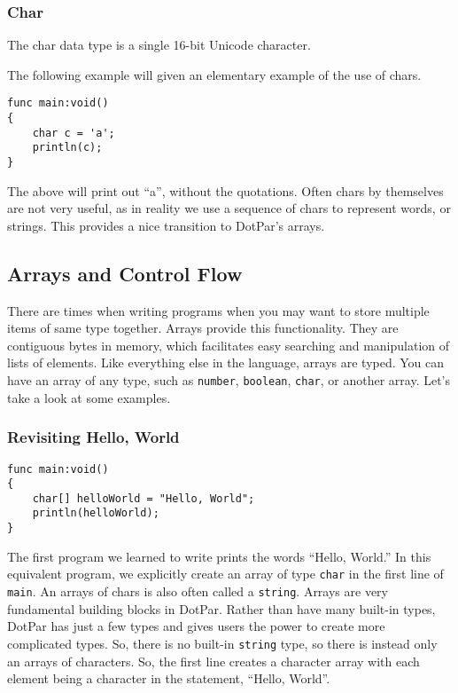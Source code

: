 \subsubsection{Char}
The char data type is a single 16-bit Unicode character. 

The following example will given an elementary example of the use of chars.

\begin{verbatim}
func main:void()
{
    char c = 'a';
    println(c);
}
\end{verbatim}

The above will print out ``a'', without the quotations. Often chars by
themselves are not very useful, as in reality we use a sequence of chars to
represent words, or strings.  This provides a nice transition to DotPar's
arrays.

\subsection{Arrays and Control Flow}
There are times when writing programs when you may want to store multiple items
of same type together. Arrays provide this functionality. They are contiguous
bytes in memory, which facilitates easy searching and manipulation of lists of
elements. Like everything else in the language, arrays are typed. You can have
an array of any type, such as \verb=number=, \verb=boolean=, \verb=char=, or
another array. Let's take a look at some examples.

\subsubsection{Revisiting Hello, World}

\begin{verbatim}
func main:void()
{
    char[] helloWorld = "Hello, World";
    println(helloWorld);
}
\end{verbatim}

The first program we learned to write prints the words ``Hello, World.''  In this equivalent program, we explicitly create an array of type \verb=char= in the first line of \verb=main=. An arrays of chars is also often called a \verb=string=. Arrays are very fundamental building blocks in DotPar. Rather than have many built-in types, DotPar has just a few types and gives users the power to create more complicated types. So, there is no built-in \verb=string= type, so there is instead only an arrays of characters. So, the first line creates a character array with each element being a character in the statement, ``Hello, World''.


